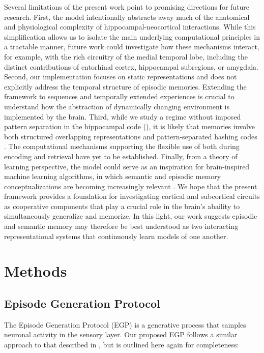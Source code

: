 \documentclass{article}
\begin{document}
Several limitations of the present work point to promising directions for future research. First, the model intentionally abstracts away much of the anatomical and physiological complexity of hippocampal-neocortical interactions. While this simplification allows us to isolate the main underlying computational principles in a tractable manner, future work could investigate how these mechanisms interact, for example, with the rich circuitry of the medial temporal lobe, including the distinct contributions of entorhinal cortex, hippocampal subregions, or amygdala. Second, our implementation focuses on static representations and does not explicitly address the temporal structure of episodic memories. Extending the framework to sequences and temporally extended experiences is crucial to understand how the abstraction of dynamically changing environment is implemented by the brain. Third, while we study a regime without imposed pattern separation in the hippocampal code (), it is likely that memories involve both structured overlapping representations and pattern-separated hashing codes . The computational mechanisms supporting the flexible use of both during encoding and retrieval have yet to be established. Finally, from a theory of learning perspective, the model could serve as an inspiration for brain-inspired machine learning algorithms, in which semantic and episodic memory conceptualizations are becoming increasingly relevant .  
\newline\newline
We hope that the present framework provides a foundation for investigating cortical and subcortical circuits as cooperative components that play a crucial role in the brain's abaility to simultaneously generalize and memorize. In this light, our work suggests episodic and semantic memory may therefore be best understood as two interacting representational systems that continuously learn models of one another.
\newpage
\section*{Methods}\label{methods}
\subsection*{Episode Generation Protocol}
The Episode Generation Protocol (EGP) is a generative process that samples neuronal activity in the sensory layer. Our proposed EGP follows a similar approach to that described in , but is outlined here again for completeness:
\end{document}
